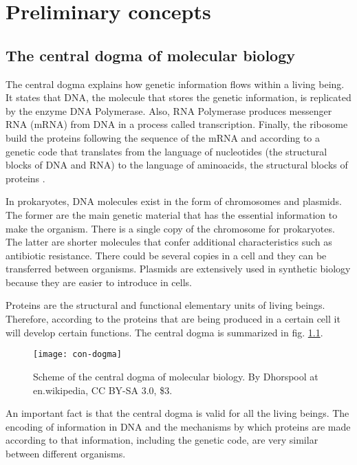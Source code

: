 \chapter{Preliminary concepts}

\section{The central dogma of molecular biology}

The central dogma explains how genetic information flows within a living being. It states that DNA, the molecule that stores the genetic information, is replicated by the enzyme DNA Polymerase. Also, RNA Polymerase produces messenger RNA (mRNA) from DNA in a process called transcription. Finally, the ribosome build the proteins following the sequence of the mRNA and according to a genetic code that translates from the language of nucleotides (the structural blocks of DNA and RNA) to the language of aminoacids, the structural blocks of proteins \cite{alberts13}.

In prokaryotes, DNA molecules exist in the form of chromosomes and plasmids. The former are the main genetic material that has the essential information to make the organism. There is a single copy of the chromosome for prokaryotes. The latter are shorter molecules that confer additional characteristics such as antibiotic resistance. There could be several copies in a cell and they can be transferred between organisms. Plasmids are extensively used in synthetic biology because they are easier to introduce in cells.

Proteins are the structural and functional elementary units of living beings. Therefore, according to the proteins that are being produced in a certain cell it will develop certain functions. The central dogma is summarized in fig. \ref{fig:con-dogma}.

\begin{figure}[H]
  \centering
  \texttt{[image: con-dogma]}
  \caption[Central dogma of molecular biology]{\label{fig:con-dogma} Scheme of the central dogma of molecular biology. By Dhorspool at en.wikipedia, CC BY-SA 3.0, \$3.}
\end{figure}

An important fact is that the central dogma is valid for all the living beings. The encoding of information in DNA and the mechanisms by which proteins are made according to that information, including the genetic code, are very similar between different organisms.

